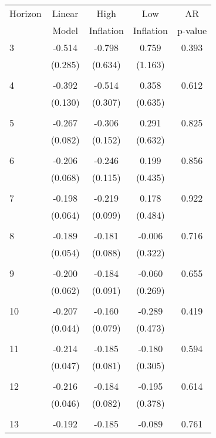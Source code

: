 \begin{tabular}{l*{1}{cccc}}
\hline\hline
 Horizon  & Linear & High                 & Low           & AR            \\
                  & Model         & Inflation & Inflation & p-value       \\
\hline
   3       & -0.514 & -0.798 & 0.759 & 0.393 \\
          & (0.285) & (0.634) & (1.163) & \\
 & & & &\\
   4       & -0.392 & -0.514 & 0.358 & 0.612 \\
          & (0.130) & (0.307) & (0.635) & \\
 & & & &\\
   5       & -0.267 & -0.306 & 0.291 & 0.825 \\
          & (0.082) & (0.152) & (0.632) & \\
 & & & &\\
   6       & -0.206 & -0.246 & 0.199 & 0.856 \\
          & (0.068) & (0.115) & (0.435) & \\
 & & & &\\
   7       & -0.198 & -0.219 & 0.178 & 0.922 \\
          & (0.064) & (0.099) & (0.484) & \\
 & & & &\\
   8       & -0.189 & -0.181 & -0.006 & 0.716 \\
          & (0.054) & (0.088) & (0.322) & \\
 & & & &\\
   9       & -0.200 & -0.184 & -0.060 & 0.655 \\
          & (0.062) & (0.091) & (0.269) & \\
 & & & &\\
  10       & -0.207 & -0.160 & -0.289 & 0.419 \\
          & (0.044) & (0.079) & (0.473) & \\
 & & & &\\
  11       & -0.214 & -0.185 & -0.180 & 0.594 \\
          & (0.047) & (0.081) & (0.305) & \\
 & & & &\\
  12       & -0.216 & -0.184 & -0.195 & 0.614 \\
          & (0.046) & (0.082) & (0.378) & \\
 & & & &\\
  13       & -0.192 & -0.185 & -0.089 & 0.761 \\

\end{tabular}
